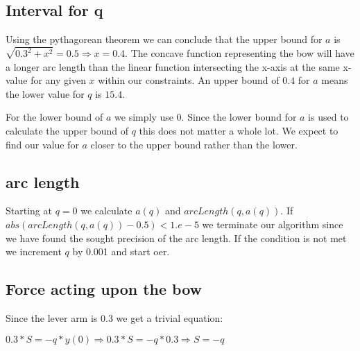 \subsection{Interval for q}
Using the pythagorean theorem we can conclude that the upper bound for $a$ is $\sqrt{0.3^2+x^2}=0.5 \Rightarrow x=0.4$. The concave function representing the bow will have a longer arc length than the linear function intersecting the x-axis at the same x-value for any given $x$ within our constraints. An upper bound of $0.4$ for $a$ means the lower value for $q$ is $15.4$. 

For the lower bound of $a$ we simply use 0. Since the lower bound for $a$ is used to calculate the upper bound of $q$ this does not matter a whole lot. We expect to find our value for $a$ closer to the upper bound rather than the lower.

\subsection{arc length}
Starting at $q=0$ we calculate $a(q)$ and $arcLength(q, a(q))$. If $abs(arcLength(q, a(q))-0.5) < 1.e-5$ we terminate our algorithm since we have found the sought precision of the arc length. If the condition is not met we increment $q$ by 0.001 and start oer.

\subsection{Force acting upon the bow}
Since the lever arm is 0.3 we get a trivial equation:

$0.3*S=-q*y(0) \Rightarrow 0.3*S=-q*0.3 \Rightarrow S=-q$